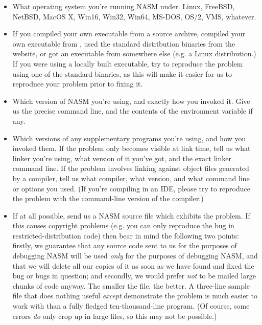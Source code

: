 \begin{itemize}
    \item{What operating system you're running NASM under. Linux,
        FreeBSD, NetBSD, MacOS X, Win16, Win32, Win64, MS-DOS, OS/2, VMS,
        whatever.}

    \item{If you compiled your own executable from a source archive, compiled
        your own executable from , used the standard distribution
        binaries from the website, or got an executable from somewhere else
        (e.g. a Linux distribution.) If you were using a locally built
        executable, try to reproduce the problem using one of the standard
        binaries, as this will make it easier for us to reproduce your problem
        prior to fixing it.}

    \item{Which version of NASM you're using, and exactly how you invoked
        it. Give us the precise command line, and the contents of the
         environment variable if any.}

    \item{Which versions of any supplementary programs you're using, and
        how you invoked them. If the problem only becomes visible at link
        time, tell us what linker you're using, what version of it you've
        got, and the exact linker command line. If the problem involves
        linking against object files generated by a compiler, tell us what
        compiler, what version, and what command line or options you used.
        (If you're compiling in an IDE, please try to reproduce the problem
        with the command-line version of the compiler.)}

    \item{If at all possible, send us a NASM source file which exhibits the
        problem. If this causes copyright problems (e.g. you can only
        reproduce the bug in restricted-distribution code) then bear in mind
        the following two points: firstly, we guarantee that any source code
        sent to us for the purposes of debugging NASM will be used \emph{only}
        for the purposes of debugging NASM, and that we will delete all our
        copies of it as soon as we have found and fixed the bug or bugs in
        question; and secondly, we would prefer \emph{not} to be mailed large
        chunks of code anyway. The smaller the file, the better. A
        three-line sample file that does nothing useful \emph{except}
        demonstrate the problem is much easier to work with than a
        fully fledged ten-thousand-line program. (Of course, some errors
        \emph{do} only crop up in large files, so this may not be possible.)}


\end{itemize}

